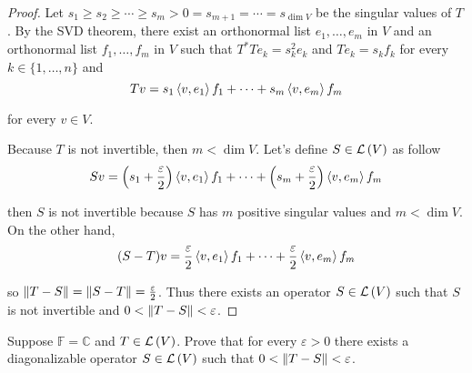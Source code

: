 \begin{proof}
    Let $s_{1}\geq s_{2}\geq \cdots \geq s_{m} > 0 = s_{m+1} = \cdots = s_{\dim V}$ be the singular values of $T$. By the SVD theorem, there exist an orthonormal list $e_{1}, \ldots, e_{m}$ in $V$ and an orthonormal list $f_{1}, \ldots, f_{m}$ in $V$ such that $T^{*}Te_{k} = s_{k}^{2}e_{k}$ and $Te_{k} = s_{k}f_{k}$ for every $k\in\{ 1,\ldots,n \}$ and
    \[
        Tv = s_{1}\left\langle{v,e_{1}}\right\rangle f_{1} + \cdots + s_{m}\left\langle{v,e_{m}}\right\rangle f_{m}
    \]

    for every $v\in V$.

    Because $T$ is not invertible, then $m < \dim V$. Let's define $S\in\mathcal{L}\left({V}\right)$ as follow
    \[
        Sv = \left(s_{1} + \frac{\varepsilon}{2}\right)\left\langle{v,e_{1}}\right\rangle f_{1} + \cdots + \left(s_{m} + \frac{\varepsilon}{2}\right)\left\langle{v, e_{m}}\right\rangle f_{m}
    \]

    then $S$ is not invertible because $S$ has $m$ positive singular values and $m < \dim V$. On the other hand,
    \[
        (S - T)v = \frac{\varepsilon}{2}\left\langle{v,e_{1}}\right\rangle f_{1} + \cdots + \frac{\varepsilon}{2}\left\langle{v,e_{m}}\right\rangle f_{m}
    \]

    so $\left\Vert{T - S}\right\Vert = \left\Vert{S - T}\right\Vert = \frac{\varepsilon}{2}$. Thus there exists an operator $S\in\mathcal{L}\left({V}\right)$ such that $S$ is not invertible and $0 < \left\Vert{T - S}\right\Vert < \varepsilon$.
\end{proof}
\newpage

\begin{exercise}
    Suppose $\mathbb{F} = \mathbb{C}$ and $T\in\mathcal{L}\left({V}\right)$. Prove that for every $\varepsilon > 0$ there exists a diagonalizable operator $S\in\mathcal{L}\left({V}\right)$ such that $0 < \left\Vert{T - S}\right\Vert < \varepsilon$.
\end{exercise}

